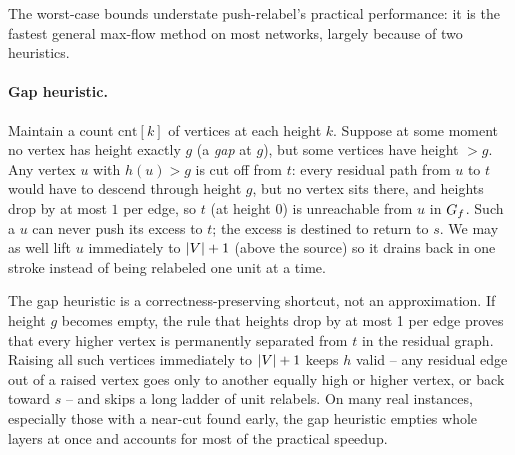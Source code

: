 The worst-case bounds understate push-relabel's practical performance: it is the fastest general max-flow method on most networks, largely because of two heuristics.

\paragraph{Gap heuristic.} Maintain a count $\mathrm{cnt}[k]$ of vertices at each height $k$. Suppose at some moment no vertex has height exactly $g$ (a \emph{gap} at $g$), but some vertices have height $>g$. Any vertex $u$ with $h(u)>g$ is cut off from $t$: every residual path from $u$ to $t$ would have to descend through height $g$, but no vertex sits there, and heights drop by at most $1$ per edge, so $t$ (at height $0$) is unreachable from $u$ in $G_f$. Such a $u$ can never push its excess to $t$; the excess is destined to return to $s$. We may as well lift $u$ immediately to $\lvert V\rvert+1$ (above the source) so it drains back in one stroke instead of being relabeled one unit at a time.

\begin{algorithm}[H]
\caption{Gap heuristic, invoked right after a relabel that empties height $h_{\mathrm{old}}$}
\label{ch13:alg-gap}
\DontPrintSemicolon
{}
\end{algorithm}

\begin{whybox}
The gap heuristic is a correctness-preserving shortcut, not an approximation. If height $g$ becomes empty, the rule that heights drop by at most 1 per edge proves that every higher vertex is permanently separated from $t$ in the residual graph. Raising all such vertices immediately to $\lvert V\rvert+1$ keeps $h$ valid -- any residual edge out of a raised vertex goes only to another equally high or higher vertex, or back toward $s$ -- and skips a long ladder of unit relabels. On many real instances, especially those with a near-cut found early, the gap heuristic empties whole layers at once and accounts for most of the practical speedup.
\end{whybox}


